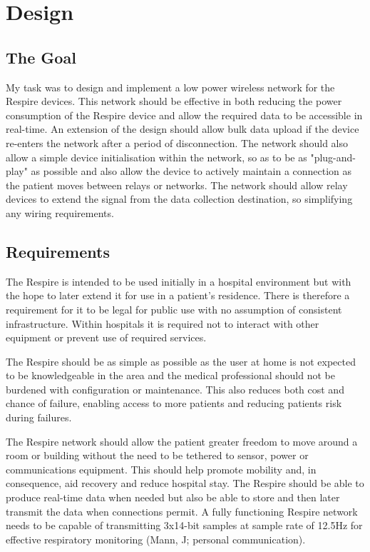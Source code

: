 
\chapter{Design}

\section{The Goal}
My task was to design and implement a low power wireless network for the Respire devices. This
network should be effective in both reducing the power consumption of the Respire device and
allow the required data to be accessible in real-time. An extension of the design should allow bulk
data upload if the device re-enters the network after a period of disconnection. The network should
also allow a simple device initialisation within the network, so as to be as "plug-and-play" as possible
and also allow the device to actively maintain a connection as the patient moves between relays or
networks. The network should allow relay devices to extend the signal from the data collection
destination, so simplifying any wiring requirements.

\section{Requirements}
The Respire is intended to be used initially in a hospital environment but with the hope to later
extend it for use in a patient’s residence. There is therefore a requirement for it to be legal for public
use with no assumption of consistent infrastructure. Within hospitals it is required not to interact
with other equipment or prevent use of required services.


The Respire should be as simple as possible as the user at home is not expected to be
knowledgeable in the area and the medical professional should not be burdened with configuration
or maintenance. This also reduces both cost and chance of failure, enabling access to more patients
and reducing patients risk during failures.


The Respire network should allow the patient greater freedom to move around a room or building
without the need to be tethered to sensor, power or communications equipment. This should help
promote mobility and, in consequence, aid recovery and reduce hospital stay.
The Respire should be able to produce real-time data when needed but also be able to store and
then later transmit the data when connections permit. A fully functioning Respire network needs to
be capable of transmitting 3x14-bit samples at sample rate of 12.5Hz for effective respiratory
monitoring (Mann, J; personal communication).


